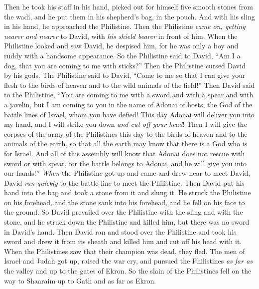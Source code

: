 \begin{biblechapter}
\verse Then he took his staff in his hand, picked out for himself five smooth stones from the wadi, and he put them in his shepherd’s bag, in the pouch. And with his sling in his hand, he approached the Philistine.
\verse Then the Philistine \textit{came on, getting nearer and nearer} to David, with \textit{his shield bearer} in front of him.
\verse When the Philistine looked and saw David, he despised him, for he was only a boy and ruddy with a handsome appearance.
\verse So the Philistine said to David, “Am I a dog, that you are coming to me with sticks?” Then the Philistine cursed David by his gods.
\verse The Philistine said to David, “Come to me so that I can give your flesh to the birds of heaven and to the wild animals of the field!”
\verse Then David said to the Philistine, “You are coming to me with a sword and with a spear and with a javelin, but I am coming to you in the name of Adonai of hosts, the God of the battle lines of Israel, whom you have defied!
\verse This day Adonai will deliver you into my hand, and I will strike you down \textit{and cut off your head}! Then I will give the corpses of the army of the Philistines this day to the birds of heaven and to the animals of the earth, so that all the earth may know that there is a God who is for Israel.
\verse And all of this assembly will know that Adonai does not rescue with sword or with spear, for the battle belongs to Adonai, and he will give you into our hands!”
 \textit{When} the Philistine got up and came and drew near to meet David, David \textit{ran quickly} to the battle line to meet the Philistine.
\verse Then David put his hand into the bag and took a stone from it and slung it. He struck the Philistine on his forehead, and the stone sank into his forehead, and he fell on his face to the ground.
\verse So David prevailed over the Philistine with the sling and with the stone, and he struck down the Philistine and killed him, but there was no sword in David’s hand.
\verse Then David ran and stood over the Philistine and took his sword and drew it from its sheath and killed him and cut off his head with it. When the Philistines saw that their champion was dead, they fled.
\verse The men of Israel and Judah got up, raised the war cry, and pursued the Philistines \textit{as far as} the valley and up to the gates of Ekron. So the slain of the Philistines fell on the way to Shaaraim up to Gath and as far as Ekron.

\end{biblechapter}

